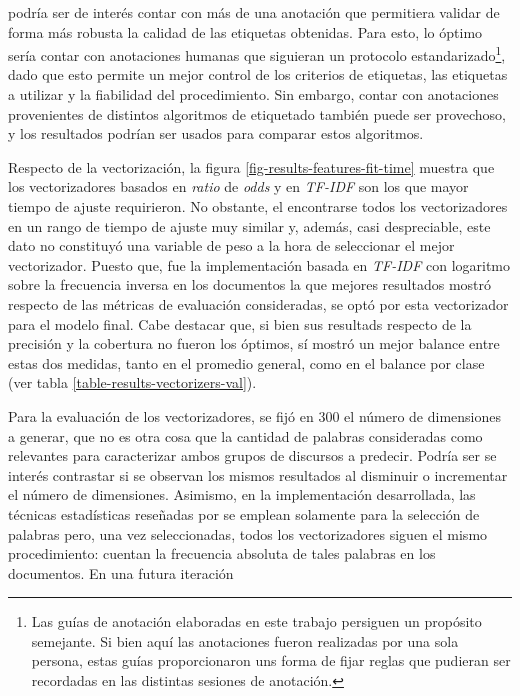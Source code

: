 podr\'ia ser de inter\'es contar con m\'as de una anotaci\'on que
permitiera validar de forma m\'as robusta la calidad de las etiquetas
obtenidas. Para esto, lo \'optimo ser\'ia contar con anotaciones
humanas que siguieran un protocolo estandarizado\footnote{Las gu\'ias
de anotaci\'on elaboradas en este trabajo persiguen un prop\'osito
semejante. Si bien aqu\'i las anotaciones fueron realizadas por una sola
persona, estas gu\'ias proporcionaron uns forma de fijar reglas que
pudieran ser recordadas en las distintas sesiones de anotaci\'on.}, dado
que esto permite un mejor control de los criterios de etiquetas, las 
etiquetas a utilizar y la fiabilidad del procedimiento. Sin embargo,
contar con anotaciones provenientes de distintos algoritmos de etiquetado
tambi\'en puede ser provechoso, y los resultados podr\'ian ser usados
para comparar estos algoritmos.
\par
Respecto de la vectorizaci\'on, la figura \ref{fig-results-features-fit-time}
muestra que los vectorizadores basados en \textit{ratio} de \textit{odds}
y en \textit{TF-IDF} son los que mayor tiempo de ajuste requirieron. No
obstante, el encontrarse todos los vectorizadores en un rango de tiempo
de ajuste muy similar y, adem\'as, casi despreciable, este dato no
constituy\'o una variable de peso a la hora de seleccionar el mejor vectorizador.
Puesto que, fue la implementaci\'on basada en \textit{TF-IDF} con
logaritmo sobre la frecuencia inversa en los documentos la que
mejores resultados mostr\'o respecto de las m\'etricas de evaluaci\'on consideradas,
se opt\'o por esta vectorizador para el modelo final. Cabe destacar que, si bien
sus resultads respecto de la precisi\'on y la cobertura no fueron los \'optimos,
s\'i mostr\'o un mejor balance entre estas dos medidas, tanto en el promedio
general, como en el balance por clase (ver tabla \ref{table-results-vectorizers-val}).
\par
Para la evaluaci\'on de los vectorizadores, se fij\'o en $300$
el n\'umero de dimensiones a generar, que no es otra cosa que la
cantidad de palabras consideradas como relevantes para caracterizar
ambos grupos de discursos a predecir. Podr\'ia
ser se inter\'es contrastar si se observan los mismos resultados al
disminuir o incrementar el n\'umero de dimensiones. Asimismo, en la
implementaci\'on desarrollada, las t\'ecnicas estad\'isticas reseñadas por
\cite{monroe2008fightin} se emplean solamente
para la selecci\'on de palabras pero, una vez seleccionadas, todos
los vectorizadores siguen el mismo procedimiento: cuentan la frecuencia
absoluta de tales palabras en los documentos. En una futura iteraci\'on
